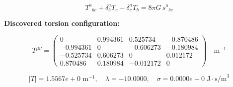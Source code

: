 
\begin{equation}
  T^a{}_{bc} + \delta^a_b T_c - \delta^a_c T_b = 8\pi G \, s^a{}_{bc}
\end{equation}

\textbf{Discovered torsion configuration:}

\begin{equation}
  T^{\mu\nu} = \begin{pmatrix}
    0 & 0.994361 & 0.525734 & -0.870486 \\
    -0.994361 & 0 & -0.606273 & -0.180984 \\
    -0.525734 & 0.606273 & 0 & 0.012172 \\
    0.870486 & 0.180984 & -0.012172 & 0
  \end{pmatrix} \quad \text{m}^{-1}
\end{equation}

\begin{equation}
  |T| = 1.5567e+0 \text{ m}^{-1}, \quad
  \lambda = -10.0000, \quad
  \sigma = 0.0000e+0 \text{ J}\cdot\text{s/m}^3
\end{equation}